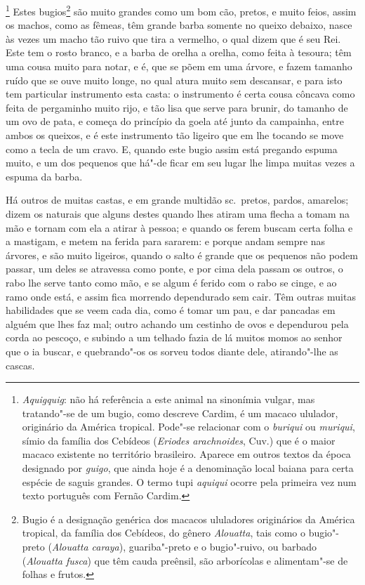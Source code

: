 \begin{linenumbers}
\footnote{ \textit{Aquigquig}: não há
referência a este animal na sinonímia vulgar, mas tratando"-se de um
bugio, como descreve Cardim, é um macaco ululador, originário da
América tropical. Pode"-se relacionar com o \textit{buriqui} ou
\textit{muriqui}, símio da família dos Cebídeos (\textit{Eriodes 
arachnoides}, Cuv.) que é o maior macaco existente no território
brasileiro. Aparece em outros textos da época designado por
\textit{guigo}, que ainda hoje é a denominação local baiana para certa
espécie de saguis grandes. O termo tupi \textit{aquiqui} ocorre pela
primeira vez num texto português com Fernão Cardim.} Estes
bugios\footnote{ Bugio é a designação genérica dos macacos
ululadores originários da América tropical, da família dos Cebídeos, 
do gênero \textit{Alouatta}, tais como o bugio"-preto (\textit{Alouatta
caraya}), guariba"-preto e o bugio"-ruivo, ou barbado 
(\textit{Alouatta fusca}) que têm cauda preênsil, são arborícolas e
alimentam"-se de folhas e frutos.} são muito grandes como um bom cão,
pretos, e muito feios, assim os machos, como as fêmeas, têm grande
barba somente no queixo debaixo, nasce às vezes um macho tão ruivo que
tira a vermelho, o qual dizem que é seu Rei. Este tem o rosto branco, e
a barba de orelha a orelha, como feita à tesoura; têm uma cousa muito
para notar, e é, que se põem em uma árvore, e fazem tamanho ruído que
se ouve muito longe, no qual atura muito sem descansar, e para isto tem
particular instrumento esta casta: o instrumento é certa cousa côncava
como feita de pergaminho muito rijo, e tão lisa que serve para brunir,
do tamanho de um ovo de pata, e começa do princípio da goela até junto
da campainha, entre ambos os queixos, e é este instrumento tão ligeiro
que em lhe tocando se move como a tecla de um cravo. E, quando este
bugio assim está pregando espuma muito, e um dos pequenos que há"-de
ficar em seu lugar lhe limpa muitas vezes a espuma da barba.

 Há outros de muitas castas, e em grande multidão sc.~pretos, pardos,
amarelos; dizem os naturais que alguns destes quando lhes atiram uma
flecha a tomam na mão e tornam com ela a atirar à pessoa; e quando os
ferem buscam certa folha e a mastigam, e metem na ferida para sararem:
e porque andam sempre nas árvores, e são muito ligeiros, quando o salto
é grande que os pequenos não podem passar, um deles se atravessa como
ponte, e por cima dela passam os outros, o rabo lhe serve tanto como
mão, e se algum é ferido com o rabo se cinge, e ao ramo onde está, e
assim fica morrendo dependurado sem cair. Têm outras muitas habilidades
que se veem cada dia, como é tomar um pau, e dar pancadas em alguém que
lhes faz mal; outro achando um cestinho de ovos e dependurou pela corda
ao pescoço, e subindo a um telhado fazia de lá muitos momos ao senhor
que o ia buscar, e quebrando"-os os sorveu todos diante dele,
atirando"-lhe as cascas. 


\end{linenumbers}
